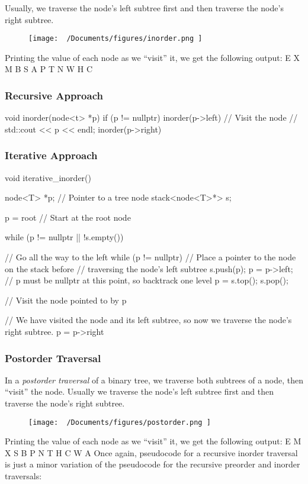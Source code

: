 \documentclass{report}
\begin{document}
\noindent Usually, we traverse the node's left subtree first and then traverse the node's right subtree.
\begin{figure}[H]
\centering
\texttt{[image:  ~/Documents/figures/inorder.png ]}
\end{figure}
\bigbreak \noindent
Printing the value of each node as we ``visit'' it, we get the following output:
\bigbreak \noindent
E X M B S A P T N W H C
\subsubsection*{Recursive Approach}
\begin{cppcode}
  void inorder(node<t> *p) { 
    if (p != nullptr) {
      inorder(p->left)
      // Visit the node
      // std::cout << p << endl;
      inorder(p->right)
    }
}
\end{cppcode}
\subsubsection*{Iterative Approach}
\begin{cppcode}
  
void iterative_inorder() {
  node<T> *p; // Pointer to a tree node
  stack<node<T>*> s;

  p = root // Start at the root node

  while (p != nullptr || !s.empty()) {

    // Go all the way to the left
    while (p != nullptr) {
      // Place a pointer to the node on the stack before
      // traversing the node's left subtree
      s.push(p);
      p = p->left;
    }
    // p must be nullptr at this point, so backtrack one level
    p = s.top();
    s.pop();

    // Visit the node pointed to by p
    
    // We have visited the node and its left subtree, so now we traverse the node's right subtree.
    p = p->right
  }
}
\end{cppcode}
\subsubsection{Postorder Traversal}
In a \textit{postorder traversal} of a binary tree, we traverse both subtrees of a node, then ``visit'' the node. Usually we traverse the node's left subtree first and then traverse the node's right subtree.
\bigbreak \noindent
\begin{figure}[H]
\centering
\texttt{[image:  ~/Documents/figures/postorder.png ]}
\end{figure}
\noindent
Printing the value of each node as we ``visit'' it, we get the following output:
\bigbreak \noindent
E M X S B P N T H C W A
\bigbreak \noindent
Once again, pseudocode for a recursive inorder traversal is just a minor variation of the pseudocode for the recursive preorder and inorder traversals:
\end{document}
